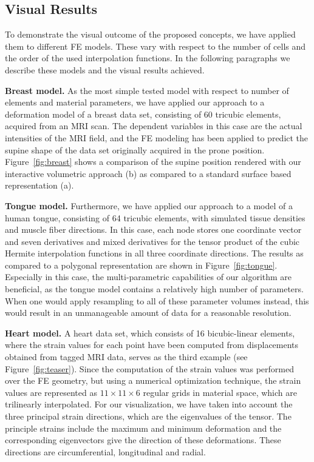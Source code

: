 \documentclass[journal]{vgtc}                %
\begin{document}
\subsection{Visual Results}

To demonstrate the visual outcome of the proposed concepts, we have applied them to different FE models. These vary with respect to the number of cells and the order of the used interpolation functions. In the following paragraphs we describe these models and the visual results achieved.

\noindent \textbf{Breast model.} As the most simple tested model with respect to number of elements and material parameters, we have applied our approach to a deformation model of a breast data set, consisting of 60 tricubic elements, acquired from an MRI scan. The dependent variables in this case are the actual intensities of the MRI field, and the FE modeling has been applied to predict the supine shape of the data set originally acquired in the prone position. Figure~\ref{fig:breast} shows a comparison of the supine position rendered with our interactive volumetric approach (b) as compared to a standard surface based representation (a).

\noindent \textbf{Tongue model.} Furthermore, we have applied our approach to a model of a human tongue, consisting of 64 tricubic elements, with simulated tissue densities and muscle fiber directions. In this case, each node stores one coordinate vector and seven derivatives and mixed derivatives for the tensor product of the cubic Hermite interpolation functions in all three coordinate directions. The results as compared to a polygonal representation are shown in Figure~\ref{fig:tongue}. Especially in this case, the multi-parametric capabilities of our algorithm are beneficial, as the tongue model contains a relatively high number of parameters. When one would apply resampling to all of these parameter volumes instead, this would result in an unmanageable amount of data for a reasonable resolution.

\noindent \textbf{Heart model.} A heart data set, which consists of 16 bicubic-linear elements,  where the strain values for each point have been computed from displacements  obtained from tagged MRI data, serves as the third example (see Figure~\ref{fig:teaser}). Since the computation of the strain values was performed over the FE geometry, but using a numerical optimization technique, the strain values are represented as $11 \times 11 \times 6$ regular grids in material space, which are trilinearly interpolated. For our visualization, we have taken into account the three principal strain directions, which are the eigenvalues of the tensor. The principle strains include the maximum and minimum deformation and the corresponding eigenvectors give the direction of these deformations. These directions are circumferential, longitudinal and radial.
\end{document}
